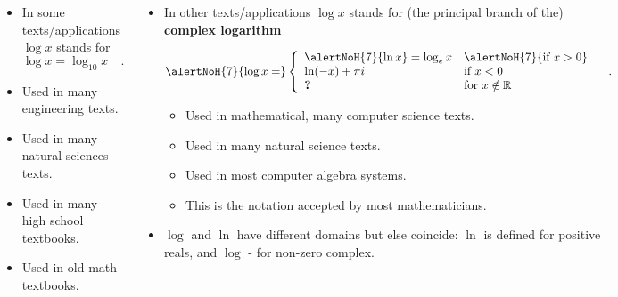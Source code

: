 \begin{frame}
 
\vskip -0.15cm
\begin{columns}
\begin{itemize}
\item<3-> In some texts/applications $\log x$ stands for
\[
\log x = \log_{10} x\quad .
\]
\item<4-> Used in many engineering texts.
\item<4-> Used in many natural sciences texts.
\item<4-> Used in many high school textbooks.
\item<4-> Used in old math textbooks.
\end{itemize}
\begin{itemize}
\item<5-> In other texts/applications $\log x$ stands for {\color{gray}(the principal branch of the)} \textbf{complex logarithm}

$
\alertNoH{7}{\log x =}\left\{\begin{array}{ll} \alertNoH{7}{\ln x} =\log_e x& \alertNoH{7}{ \text{if  } x>0} \\ \ln (-x) +\pi i&\text{if } x<0 \\ \textbf{?} &\text{for } x \notin \mathbb R\end{array}\right. \quad .
$
\begin{itemize}
\item<6-> Used in mathematical, many computer science texts.
\item<6-> Used in many natural science texts.
\item<6-> Used in most computer algebra systems.
\item<6-> This is the notation accepted by most mathematicians.
\end{itemize}
\item<7-> $\log $ and $\ln $ have different domains but else coincide: $\ln$ is defined for positive reals, and $\log$ - for non-zero complex.
\end{itemize}
\end{columns}
\end{frame}
